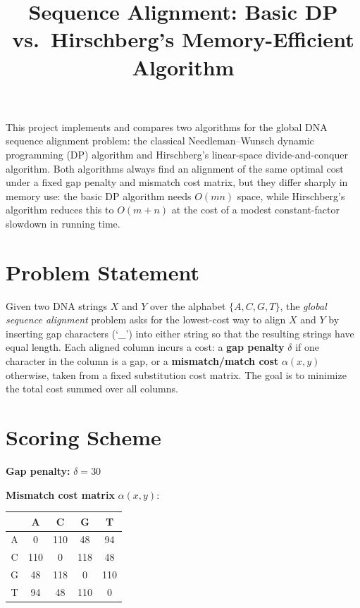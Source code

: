 \documentclass[11pt]{article}
\title{\vspace{-1.5em}Sequence Alignment: Basic DP vs.\ Hirschberg's Memory-Efficient Algorithm}
\author{}
\date{}
\begin{document}
\maketitle
\vspace{-3em}

This project implements and compares two algorithms for the global DNA sequence
alignment problem: the classical Needleman--Wunsch dynamic programming (DP)
algorithm and Hirschberg's linear-space divide-and-conquer algorithm. Both
algorithms always find an alignment of the same optimal cost under a fixed gap
penalty and mismatch cost matrix, but they differ sharply in memory use: the
basic DP algorithm needs $O(mn)$ space, while Hirschberg's algorithm reduces
this to $O(m+n)$ at the cost of a modest constant-factor slowdown in running
time.

\section{Problem Statement}

Given two DNA strings $X$ and $Y$ over the alphabet $\{A, C, G, T\}$, the
\emph{global sequence alignment} problem asks for the lowest-cost way to align
$X$ and $Y$ by inserting gap characters (`\_') into either string so that the
resulting strings have equal length. Each aligned column incurs a cost: a
\textbf{gap penalty} $\delta$ if one character in the column is a gap, or a
\textbf{mismatch/match cost} $\alpha(x,y)$ otherwise, taken from a fixed
substitution cost matrix. The goal is to minimize the total cost summed over
all columns.

\section{Scoring Scheme}

\textbf{Gap penalty:} $\delta = 30$

\textbf{Mismatch cost matrix} $\alpha(x,y)$:

\begin{center}
\begin{tabular}{c|cccc}
\toprule
 & A & C & G & T \\
\midrule
A & 0   & 110 & 48  & 94  \\
C & 110 & 0   & 118 & 48  \\
G & 48  & 118 & 0   & 110 \\
T & 94  & 48  & 110 & 0   \\
\bottomrule
\end{tabular}
\end{center}
\end{document}
